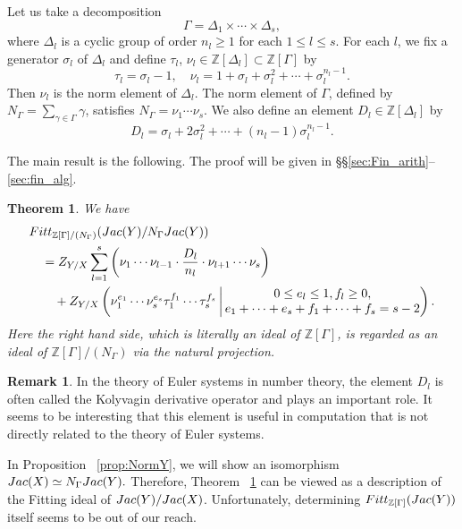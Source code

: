\documentclass[11pt]{article}
\newtheorem{thm}[theo]{Theorem}
\theoremstyle{definition}
\newtheorem{rema}[theo]{Remark}
\numberwithin{equation}{section}
\newcommand{\Z}{\mathbb{Z}}
\newcommand{\Jac}{{\rm Jac}}
\newcommand{\Fitt}{{\rm Fitt}}
\begin{document}
Let us take a decomposition
\[
\Gamma = \Delta_1 \times \cdots \times \Delta_s,
\]
where $\Delta_l$ is a cyclic group of order $n_l \geq 1$ for each $1 \leq l \leq s$.
For each $l$, we fix a generator $\sigma_l$ of $\Delta_l$ and define $\tau_l$, $\nu_l \in \Z[\Delta_l] \subset \Z[\Gamma]$ by
\[
\tau_l = \sigma_l - 1,
\quad
\nu_l = 1 + \sigma_l + \sigma_l^2 + \cdots + \sigma_l^{n_l-1}.
\]
Then $\nu_l$ is the norm element of $\Delta_l$.
The norm element of $\Gamma$, defined by $N_{\Gamma} = \sum_{\gamma \in \Gamma} \gamma$, satisfies $N_{\Gamma} = \nu_1 \cdots \nu_s$.
We also define an element $D_l \in \Z[\Delta_l]$ by
\[
D_l = \sigma_l + 2 \sigma_l^2 + \cdots + (n_l-1) \sigma_l^{n_l-1}.
\]

The main result is the following.
The proof will be given in \S\S\ref{sec:Fin_arith}--\ref{sec:fin_alg}.

\begin{thm}\label{thm:main_fin}
We have
\begin{align}
& \Fitt_{\Z[\Gamma]/(N_{\Gamma})}(\Jac(Y)/N_{\Gamma}\Jac(Y))\\
& \quad = Z_{Y/X} \sum_{l=1}^s \left( \nu_1 \cdots \nu_{l-1} \cdot \frac{D_l}{n_l} \cdot \nu_{l+1} \cdots \nu_s \right) \\
& \quad \quad + Z_{Y/X} \left(\nu_1^{e_1} \cdots \nu_s^{e_s} \tau_1^{f_1} \cdots \tau_s^{f_s} \, \middle| \, \begin{matrix} 0 \leq e_l \leq 1, f_l \geq 0, \\ e_1 + \cdots + e_s + f_1 + \cdots + f_s = s- 2 \end{matrix} \right).
\end{align}
Here the right hand side, which is literally an ideal of $\Z[\Gamma]$, is regarded as an ideal of $\Z[\Gamma]/(N_{\Gamma})$ via the natural projection.
\end{thm}

\begin{rema}\label{rem:Kol}
In the theory of Euler systems in number theory, the element $D_l$ is often called the Kolyvagin derivative operator and plays an important role.
It seems to be interesting that this element is useful in computation that is not directly related to the theory of Euler systems.
\end{rema}

In Proposition ~\ref{prop:NormY}, we will show an isomorphism
$
\Jac(X) \simeq N_{\Gamma} \Jac(Y).
$
Therefore, Theorem ~\ref{thm:main_fin} can be viewed as a description of the Fitting ideal of $\Jac(Y)/\Jac(X)$.
Unfortunately, determining $\Fitt_{\Z[\Gamma]}(\Jac(Y))$ itself seems to be out of our reach.
\end{document}
